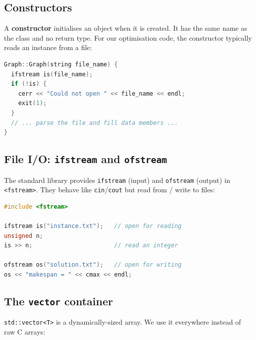 \subsection{Constructors}
\label{ssec:constructors}

A \textbf{constructor} initialises an object when it is created.
It has the same name as the class and no return type.
For our optimisation code, the constructor typically reads an
instance from a file:

\begin{lstlisting}[language=C++, caption={Constructor that reads
  from a file.}]
Graph::Graph(string file_name) {
  ifstream is(file_name);
  if (!is) {
    cerr << "Could not open " << file_name << endl;
    exit(1);
  }
  // ... parse the file and fill data members ...
}
\end{lstlisting}

\subsection{File I/O: \texttt{ifstream} and \texttt{ofstream}}
\label{ssec:file-io}

The standard library provides \texttt{ifstream} (input) and
\texttt{ofstream} (output) in \texttt{<fstream>}.
They behave like \texttt{cin}/\texttt{cout} but read from / write
to files:

\begin{lstlisting}[language=C++, caption={Reading and writing files.}]
#include <fstream>

ifstream is("instance.txt");   // open for reading
unsigned n;
is >> n;                       // read an integer

ofstream os("solution.txt");   // open for writing
os << "makespan = " << cmax << endl;
\end{lstlisting}

\subsection{The \texttt{vector} container}
\label{ssec:vector}

\texttt{std::vector<T>} is a dynamically-sized array.  We use it
everywhere instead of raw C arrays:

